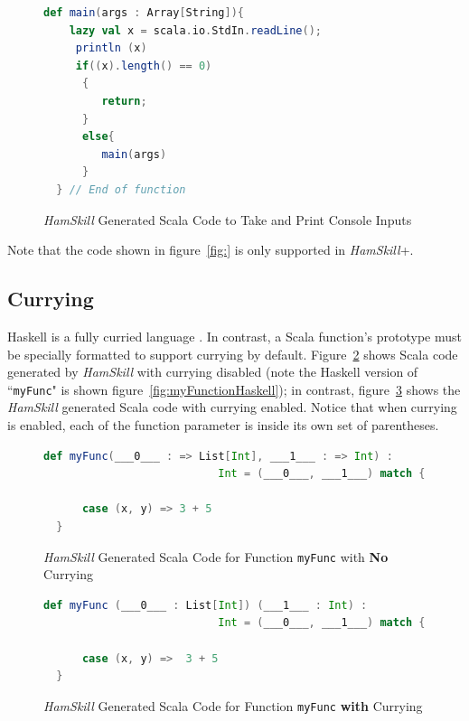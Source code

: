 \documentclass{report}
\begin{document}
\begin{figure}[H]
\begin{mdframed}
\begin{lstlisting}[language=scala]
  def main(args : Array[String]){
    lazy val x = scala.io.StdIn.readLine();
     println (x)
     if((x).length() == 0)
      {
         return;
      }
      else{
         main(args)
      }
  } // End of function
\end{lstlisting}
\end{mdframed}
\caption{\textit{HamSkill} Generated Scala Code to Take and Print Console Inputs}\label{fig:functionScalaMainConsoleInput}
\end{figure}

Note that the code shown in figure~\ref{fig:} is only supported in \textit{HamSkill}+.

\subsection{Currying}\label{sec:currying}

Haskell is a fully curried language \cite{learnYouAHaskell}.  In contrast, a Scala function's prototype must be specially formatted to support currying by default. Figure~\ref{fig:myFuncInScalaNoCurrying} shows Scala code generated by \textit{HamSkill} with currying disabled (note the Haskell version of ``\texttt{myFunc}" is shown figure~\ref{fig:myFunctionHaskell}); in contrast, figure~\ref{fig:myFuncInScalaWithCurrying} shows the \textit{HamSkill} generated Scala code with currying enabled.  Notice that when currying is enabled, each of the function parameter is inside its own set of parentheses.

\begin{figure}[H]
\begin{mdframed}
\begin{lstlisting}[basicstyle=\small, language=scala]
  def myFunc(___0___ : => List[Int], ___1___ : => Int) : 
                           Int = (___0___, ___1___) match {
      
      case (x, y) => 3 + 5
  } 
\end{lstlisting}
\end{mdframed}
\caption{\textit{HamSkill} Generated Scala Code for Function \texttt{myFunc} with \textbf{No} Currying}\label{fig:myFuncInScalaNoCurrying}
\end{figure}

\begin{figure}[H]
\begin{mdframed}
\begin{lstlisting}[basicstyle=\small, language=scala]
  def myFunc (___0___ : List[Int]) (___1___ : Int) :  
                           Int = (___0___, ___1___) match {
      
      case (x, y) =>  3 + 5
  }
\end{lstlisting}
\end{mdframed}
\caption{\textit{HamSkill} Generated Scala Code for Function \texttt{myFunc} \textbf{with} Currying}\label{fig:myFuncInScalaWithCurrying}
\end{figure}
\end{document}
